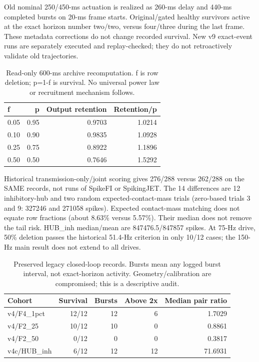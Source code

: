 \documentclass[10pt,letterpaper]{article}
\begin{document}
Old nominal 250/450-ms actuation is realized as 260-ms delay and 440-ms completed bursts on 20-ms frame starts. Original/gated healthy survivors active at the exact horizon number two/two, versus four/three during the last frame. These metadata corrections do not change recorded survival. New v9 exact-event runs are separately executed and replay-checked; they do not retroactively validate old trajectories.

\begin{table}[H]
\centering\small
\caption{Read-only 600-ms archive recomputation. f is row deletion; p=1-f is survival. No universal power law or recruitment mechanism follows.}
\begin{tabular}{lrrr}
\toprule
f & p & Output retention & Retention/p\\
\midrule
0.05 & 0.95 & 0.9703 & 1.0214\\
0.10 & 0.90 & 0.9835 & 1.0928\\
0.25 & 0.75 & 0.8922 & 1.1896\\
0.50 & 0.50 & 0.7646 & 1.5292\\
\bottomrule
\end{tabular}
\end{table}

Historical transmission-only/joint scoring gives 276/288 versus 262/288 on the SAME records, not runs of SpikeFI or SpikingJET. The 14 differences are 12 inhibitory-hub and two random expected-contact-mass trials (zero-based trials 3 and 9: 327246 and 271058 spikes). Expected contact-mass matching does not equate row fractions (about 8.63\% versus 5.57\%). Their median does not remove the tail risk. HUB\_inh median/mean are 847476.5/847857 spikes. At 75-Hz drive, 50\% deletion passes the historical 51.4-Hz criterion in only 10/12 cases; the 150-Hz main result does not extend to all drives.

\begin{table}[H]
\centering\small
\caption{Preserved legacy closed-loop records. Bursts mean any logged burst interval, not exact-horizon activity. Geometry/calibration are compromised; this is a descriptive audit.}
\begin{tabular}{lrrrr}
\toprule
Cohort & Survival & Bursts & Above 2x & Median pair ratio\\
\midrule
v4/F4\_1pct & 12/12 & 12 & 6 & 1.7029\\
v4/F2\_25 & 10/12 & 10 & 0 & 0.8861\\
v4/F2\_50 & 0/12 & 0 & 0 & 0.3817\\
v4c/HUB\_inh & 6/12 & 12 & 12 & 71.6931\\
\bottomrule
\end{tabular}
\end{table}
\end{document}
